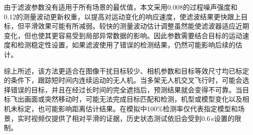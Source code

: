 由于滤波参数没有适用于所有场景的最优值，本文采用0.008的过程噪声强度和0.12的测量波动更新权重，以提高对运动变化的响应速度，使滤波结果更快跟上目标，但平滑效果可能有所减弱。较快的测量波动估计调整虽然能使滤波器适应近期变化，但也使其更容易受到局部异常数据的影响。因此参数需要结合目标的运动速度和检测稳定性设置，如果滤波使用了错误的检测结果，仍然可能影响后续的估计。

综上所述，该方法更适合在图像干扰目标较少、相机参数和目标等效尺寸均已标定的条件下，跟踪短时间内连续运动的无人机。当多架无人机交叉飞行时，可能会选择错误的目标，并且在经过长时间的完全遮挡后，预测结果就会变得不可靠。当目标飞出画面或突然移动时，可能无法完成目标匹配和检测，机型或模型变化以及相机未标定，也可能影响距离估计结果。在模拟中100\%检测率仅代表指定模型和场景，实时视频仅提供了相对平滑的证据，历史状态测试依旧会受到0.6\,s设置的限制。
